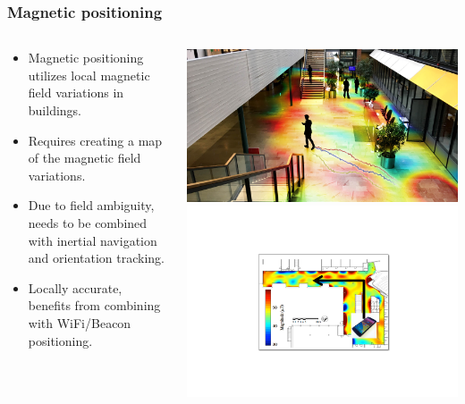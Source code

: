 \documentclass[xcolor=svgnames,english,presentation]{beamer}
\begin{document}
\begin{frame}
  \frametitle{Magnetic positioning}

  \begin{columns}
  \begin{column}{0.6\textwidth}
  \begin{itemize}[<+->]       
  \item \alert{Magnetic positioning} utilizes \alert{local magnetic field variations} in buildings.
  \item Requires creating a \alert{map of the magnetic field variations}.
  \item Due to field ambiguity, needs to be combined with \alert{inertial navigation} and \alert{orientation tracking}.
  \item \alert{Locally accurate}, benefits from \alert{combining with WiFi/Beacon positioning}.
  \end{itemize}
  \end{column}
  \begin{column}{0.4\textwidth}
  \includegraphics[width=\columnwidth]{terrain-matching} \\
  \vspace{2em}
  \includegraphics[width=\columnwidth]{magnetic}
  \end{column}
  \end{columns}
\end{frame}
\end{document}
